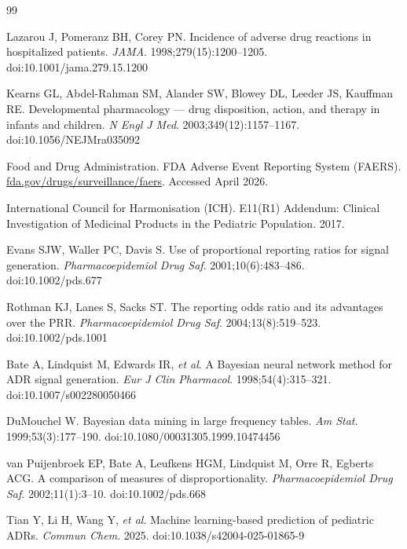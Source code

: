 \documentclass[10pt]{article}
\begin{document}
\renewcommand{\refname}{References}
\begin{thebibliography}{99}
 
Lazarou J, Pomeranz BH, Corey PN.
Incidence of adverse drug reactions in hospitalized patients.
\textit{JAMA}. 1998;279(15):1200--1205.
doi:10.1001/jama.279.15.1200
 
Kearns GL, Abdel-Rahman SM, Alander SW, Blowey DL, Leeder JS, Kauffman RE.
Developmental pharmacology --- drug disposition, action, and therapy in infants and children.
\textit{N Engl J Med}. 2003;349(12):1157--1167.
doi:10.1056/NEJMra035092
 
Food and Drug Administration.
FDA Adverse Event Reporting System (FAERS).
\href{https://www.fda.gov/drugs/surveillance/fda-adverse-event-reporting-system-faers}{fda.gov/drugs/surveillance/faers}.
Accessed April 2026.
 
International Council for Harmonisation (ICH).
E11(R1) Addendum: Clinical Investigation of Medicinal Products in the Pediatric Population. 2017.
 
Evans SJW, Waller PC, Davis S.
Use of proportional reporting ratios for signal generation.
\textit{Pharmacoepidemiol Drug Saf}. 2001;10(6):483--486.
doi:10.1002/pds.677
 
Rothman KJ, Lanes S, Sacks ST.
The reporting odds ratio and its advantages over the PRR.
\textit{Pharmacoepidemiol Drug Saf}. 2004;13(8):519--523.
doi:10.1002/pds.1001
 
Bate A, Lindquist M, Edwards IR, \textit{et al}.
A Bayesian neural network method for ADR signal generation.
\textit{Eur J Clin Pharmacol}. 1998;54(4):315--321.
doi:10.1007/s002280050466
 
DuMouchel W.
Bayesian data mining in large frequency tables.
\textit{Am Stat}. 1999;53(3):177--190.
doi:10.1080/00031305.1999.10474456
 
van Puijenbroek EP, Bate A, Leufkens HGM, Lindquist M, Orre R, Egberts ACG.
A comparison of measures of disproportionality.
\textit{Pharmacoepidemiol Drug Saf}. 2002;11(1):3--10.
doi:10.1002/pds.668
 
Tian Y, Li H, Wang Y, \textit{et al}.
Machine learning-based prediction of pediatric ADRs.
\textit{Commun Chem}. 2025.
doi:10.1038/s42004-025-01865-9
 

\end{thebibliography}
\end{document}
